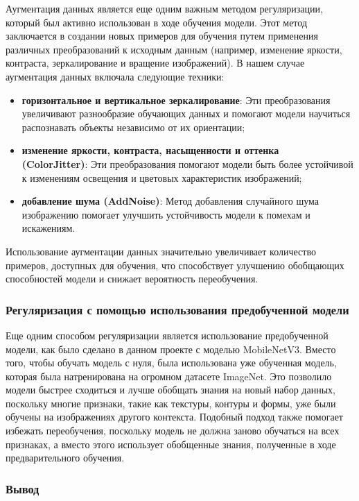 {    Аугментация данных является еще одним важным методом регуляризации, который был активно использован в ходе обучения модели. Этот метод заключается в создании новых примеров для обучения путем применения различных преобразований к исходным данным (например, изменение яркости, контраста, зеркалирование и вращение изображений). В нашем случае аугментация данных включала следующие техники:
    \begin{itemize}
        \item \textbf{горизонтальное и вертикальное зеркалирование}: Эти преобразования увеличивают разнообразие обучающих данных и помогают модели научиться распознавать объекты независимо от их ориентации;
        \item \textbf{изменение яркости, контраста, насыщенности и оттенка \\ (ColorJitter)}: Эти преобразования помогают модели быть более устойчивой к изменениям освещения и цветовых характеристик изображений;
        \item \textbf{добавление шума (AddNoise)}: Метод добавления случайного шума изображению помогает улучшить устойчивость модели к помехам и искажениям.
    \end{itemize}

    Использование аугментации данных значительно увеличивает количество примеров, доступных для обучения, что способствует улучшению обобщающих способностей модели и снижает вероятность переобучения.

    \subsubsection*{Регуляризация с помощью использования предобученной модели}

    Еще одним способом регуляризации является использование предобученной модели, как было сделано в данном проекте с моделью MobileNetV3. Вместо того, чтобы обучать модель с нуля, была использована уже обученная модель, которая была натренирована на огромном датасете ImageNet. Это позволило модели быстрее сходиться и лучше обобщать знания на новый набор данных, поскольку многие признаки, такие как текстуры, контуры и формы, уже были обучены на изображениях другого контекста. Подобный подход также помогает избежать переобучения, поскольку модель не должна заново обучаться на всех признаках, а вместо этого использует обобщенные знания, полученные в ходе предварительного обучения.

    \subsubsection*{Вывод}

}
